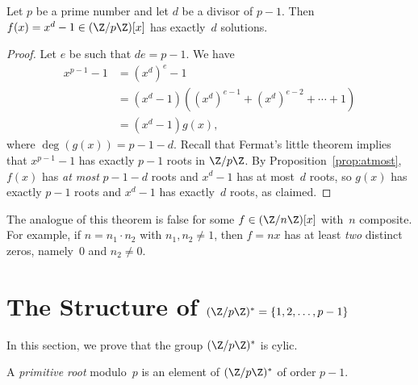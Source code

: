 \documentclass[11pt]{report}
\begin{document}

\begin{proposition}\label{prop:dsols}
  Let $p$ be a prime number and let $d$ be a divisor
  of $p-1$.  Then $f(x) = x^d-1\in(\Z/p\Z)[x]$ has
  exactly~$d$ solutions.
\end{proposition}
\begin{proof}
  Let $e$ be such that $de=p-1$.
  We have
  \begin{align*}
    x^{p-1} - 1 & = (x^d)^e - 1                                       \\
                & = (x^d - 1)((x^d)^{e-1} + (x^d)^{e-2} + \cdots + 1) \\
                & = (x^d - 1)g(x),
  \end{align*}
  where $\deg(g(x)) = p-1-d$.
  Recall that Fermat's little theorem implies that $x^{p-1}-1$ has
  exactly $p-1$ roots in $\Z/p\Z$.  By Proposition~\ref{prop:atmost},
  $f(x)$ has {\em at most}
  $p-1-d$ roots and $x^d-1$ has at most~$d$ roots, so
  $g(x)$ has exactly $p-1$ roots and $x^d - 1$ has
  exactly~$d$ roots, as claimed.
\end{proof}

 The analogue of this theorem is false
for some $f\in(\Z/n\Z)[x]$ with~$n$ composite.
For example, if $n=n_1\cdot n_2$ with $n_1, n_2\neq 1$, then
$f=nx$ has at least {\em two} distinct zeros, namely~$0$
and $n_2\neq 0$.

\section{The Structure of $(\Z/p\Z)^* = \{1,2,\ldots, p-1\}$}
In this section, we prove that the group
$(\Z/p\Z)^*$ is cylic.

\begin{definition}
  A {\em primitive root} modulo~$p$ is an element of
  $(\Z/p\Z)^*$ of order $p-1$.
\end{definition}
\end{document}
